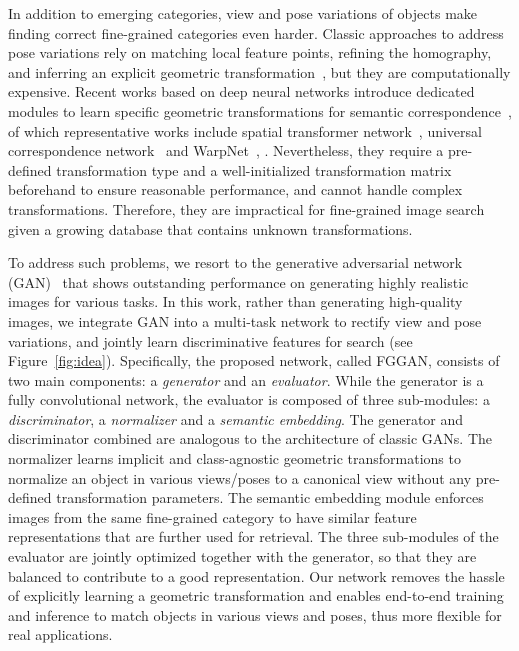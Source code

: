 \documentclass[runningheads]{llncs}
\begin{document}
In addition to emerging categories, view and pose variations of objects make finding correct fine-grained categories even harder. 
Classic approaches to address pose variations rely on matching local feature points, refining the homography, and inferring an explicit geometric transformation~\cite{DBLP:conf/cvpr/PhilbinCISZ07,DBLP:journals/ijcv/JegouDS10,DBLP:conf/cvpr/LiLH15}, but they are computationally expensive.
Recent works based on deep neural networks introduce dedicated modules to learn specific geometric transformations for semantic correspondence~\cite{DBLP:conf/nips/JaderbergSZK15,DBLP:conf/nips/ChoyGSC16,DBLP:conf/cvpr/KanazawaJC16,DBLP:journals/corr/RoccoAS17,DBLP:journals/corr/HanRHWCSP17,DBLP:journals/corr/KimMHJLS17}, of which representative works include spatial transformer network~\cite{DBLP:conf/nips/JaderbergSZK15}, universal correspondence network~\cite{DBLP:conf/nips/ChoyGSC16} and WarpNet~\cite{DBLP:conf/cvpr/KanazawaJC16}, \etc. 
Nevertheless, they require a pre-defined transformation type and a well-initialized transformation matrix beforehand to ensure reasonable performance, and cannot handle complex transformations. Therefore, they are impractical for fine-grained image search given a growing database that contains unknown transformations.


To address such problems, we resort to the generative adversarial network (GAN)~\cite{goodfellow2014generative} that shows outstanding performance on generating highly realistic images for various tasks. In this work, rather than generating high-quality images, we integrate GAN into a multi-task network to rectify view and pose variations, and jointly learn discriminative features for search (see Figure~\ref{fig:idea}). 
Specifically, the proposed network, called FGGAN, consists of two main components: a \emph{generator} and an \emph{evaluator}. While the generator is a fully convolutional network, the evaluator is composed of three sub-modules: a \emph{discriminator}, a \emph{normalizer} and a \emph{semantic embedding}. 
The generator and discriminator combined are analogous to the architecture of classic GANs. 
The normalizer learns implicit and class-agnostic geometric transformations to normalize an object in various views/poses to a canonical view without any pre-defined transformation parameters. 
The semantic embedding module enforces images from the same fine-grained category to have similar feature representations that are further used for retrieval. 
The three sub-modules of the evaluator are jointly optimized together with the generator, so that they are balanced to contribute to a good representation.
Our network removes the hassle of explicitly learning a geometric transformation and enables end-to-end training and inference to match objects in various views and poses, thus more flexible for real applications.  
\end{document}
